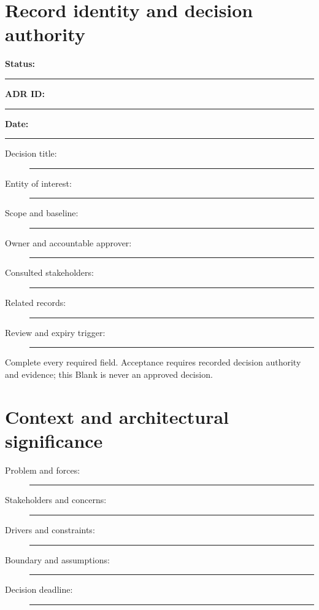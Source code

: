 \documentclass[11pt,letterpaper]{article}
\newcommand{\BlankResponse}{\rule[-0.4em]{0pt}{2em}\rule{0.65\linewidth}{0.4pt}}
\begin{document}
\makedoctocpage


\section{Record identity and decision authority}
\noindent\textbf{Status:} \rule{1.1in}{0.4pt}\quad
\textbf{ADR ID:} \rule{1.0in}{0.4pt}\quad
\textbf{Date:} \rule{1.0in}{0.4pt}

\begin{description}
\item[Decision title:] \BlankResponse
\item[Entity of interest:] \BlankResponse
\item[Scope and baseline:] \BlankResponse
\item[Owner and accountable approver:] \BlankResponse
\item[Consulted stakeholders:] \BlankResponse
\item[Related records:] \BlankResponse
\item[Review and expiry trigger:] \BlankResponse
\end{description}

\begin{notebox}
Complete every required field. Acceptance requires recorded decision
authority and evidence; this Blank is never an approved decision.
\end{notebox}

\section{Context and architectural significance}
\begin{description}
\item[Problem and forces:] \BlankResponse
\item[Stakeholders and concerns:] \BlankResponse
\item[Drivers and constraints:] \BlankResponse
\item[Boundary and assumptions:] \BlankResponse
\item[Decision deadline:] \BlankResponse
\end{description}
\end{document}
